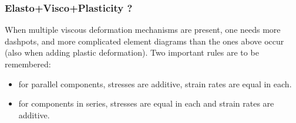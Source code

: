 \subsubsection{Elasto+Visco+Plasticity ?}

When multiple viscous deformation mechanisms are present, one needs more dashpots, and 
more complicated element diagrams than the ones above occur (also when adding plastic deformation).
Two important rules are to be remembered:
\begin{itemize}
\item for parallel components, stresses are additive, strain rates are equal in each. 
\item for components in series, stresses are equal in each and strain rates are additive. 
\end{itemize}



